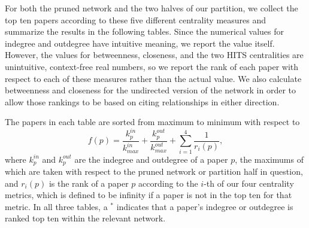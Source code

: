 \documentclass[12pt]{thesis}
\theoremstyle{plain}
\theoremstyle{definition}
\theoremstyle{remark}
\begin{document}
For both the pruned network and the two halves of our partition, we collect the top ten papers according to these five different centrality measures and summarize the results in the following tables. Since the numerical values for indegree and outdegree have intuitive meaning, we report the value itself. However, the values for betweenness, closeness, and the two HITS centralities are unintuitive, context-free real numbers, so we report the rank of each paper with respect to each of these measures rather than the actual value. We also calculate betweenness and closeness for the undirected version of the network in order to allow those rankings to be based on citing relationships in either direction.

The papers in each table are sorted from maximum to minimum with respect to \[ f(p) = \frac{k^{in}_p}{k^{in}_{max}} + \frac{k^{out}_p}{ k^{out}_{max}} + \sum_{i=1}^4 \frac{1}{r_i(p)}, \] where $k^{in}_p$ and $k^{out}_p$ are the indegree and outdegree of a paper $p$, the maximums of which are taken with respect to the pruned network or partition half in question, and $r_i(p)$ is the rank of a paper $p$ according to the $i$-th of our four centrality metrics, which is defined to be infinity if a paper is not in the top ten for that metric. In all three tables, a $^*$ indicates that a paper's indegree or outdegree is ranked top ten within the relevant network.
 
\end{document}
